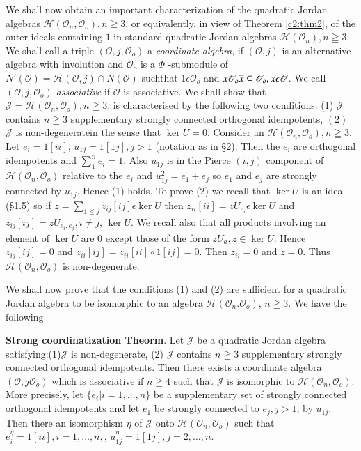 We shall now obtain an important characterization of the quadratic
Jordan algebras $\mathscr{H}(\mathscr{O}_n,\mathscr{O}_o),n\geqq 3$,
or equivalently, in view of Theorem \ref{c2:thm2}, of the outer ideals containing
$1$ in standard quadratic Jordan algebras $\mathscr{H}(\mathscr{O}_n),
n\geqq 3$. We shall call a triple $(\mathscr{O},j,\mathscr{O}_o)$ a
{\em coordinate algebra}, if $(\mathscr{O}, j)$ is an alternative
algebra with involution and $\mathscr{O}_o$ is a $\Phi$ -submodule of
$N'(\mathscr{O})=\mathscr{H}(\mathscr{O},j)\cap N(\mathscr{O})$
suchthat $1\epsilon \mathscr{O}_o$ and $x\mathscr{O}_o\overline{x}\subseteq
\mathscr{O}_o,x\epsilon \mathscr{O}$. We call
$(\mathscr{O},j,\mathscr{O}_o)$ {\em associative} if $\mathscr{O}$ is
associative. We shall show that
$\mathscr{J}=\mathscr{H}(\mathscr{O}_n,\mathscr{O}_o), n\geqq 3$, is
characterised by the following two conditions: (1) $\mathscr{J}$
contains $n\geqq 3$ supplementary strongly connected orthogonal
idempotents, $(2)$ $\mathscr{J}$ is non-degenerate\pageoriginale in
the sense that $\ker U=0$. Consider an
$\mathscr{H}(\mathscr{O}_n,\mathscr{O}_o),n\geqq 3$. Let $e_i=1[ii]$,
$u_{1j}=1[1j],j>1$ (notation as in \S 2). Then the $e_i$ are
orthogonal idempotents and $\sum\limits_{1}^{n}e_i=1$. Also $u_{1j}$
is in the Pierce $(i,j)$ component of
$\mathscr{H}(\mathscr{O}_n,\mathscr{O}_o)$ relative to the $e_i$ and
$u^{2}_{1j}=e_1+e_j$ so $e_1$ and $e_j$ are strongly connected by
$u_{1j}$. Hence (1) holds. To prove (2) we recall that $\ker U$ is an
ideal (\S 1.5) so if $z=\sum\limits_{1\leqq j} z_{ij}[ij]\epsilon \ker
U$ then $z_{ii}[ii]=zU_{e_{i}}\epsilon \ker U$ and
$z_{ij}[ij]=zU_{e_{i},e_{j}},i\neq j$, $\ker U$. We recall also that
all products involving an element of $\ker U$ are $0$ except those of
the form $zU_a,z \in  \ker U$. Hence $z_{ij}[ij]=0$ and
$z_{ii}[ij]=z_{ii}[ii]\circ 1[ij]=0$. Then $z_{ii}=0$ and $z=0$. Thus
$\mathscr{H}(\mathscr{O}_n,\mathscr{O}_o)$ is non-degenerate.

We shall now prove that the conditions (1) and (2) are sufficient for
a quadratic Jordan algebra to be isomorphic to an algebra
$\mathscr{H}(\mathscr{O}_n.\mathscr{O}_o)$, $n\geqq 3$. We have the
following

\noindent
{\textbf{Strong coordinatization Theorm}}. Let $\mathscr{J}$ be a
quadratic Jordan algebra satisfying:(1)$\mathscr{J}$ is
non-degenerate, (2) $\mathscr{J}$ contains $n\geqq 3$ supplementary
strongly connected orthogonal idempotents. Then there exists a
coordinate algebra $(\mathscr{O},j\mathscr{O}_o)$ which is associative
if $n\geqq 4$ such that $\mathscr{J}$ is isomorphic to
$\mathscr{H}(\mathscr{O}_n,\mathscr{O}_o)$. More precisely, let
$\{e_i|i=1,\ldots,n\}$ be a supplementary set of strongly connected
orthogonal idempotents and let $e_1$ be strongly connected to $e_j,j>1$,
by $u_{1j}$. Then there an isomorphism $\eta$ of $\mathscr{J}$ onto
$\mathscr{H}(\mathscr{O}_n,\mathscr{O}_o)$ such that
$e^{\eta}_i=1[ii],i=1,\ldots,n,$, $u_{1j}^{\eta}=1[1j],j=2,\ldots,n$.

